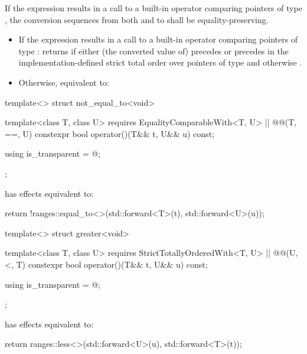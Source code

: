 {\begin{itemdescr}
\pnum
\oldtxt{\requires} \newtxt{\expects}
If the expression 
results in a call to a built-in operator \tcode{==} comparing pointers of type
, the conversion sequences from both  and  to 
shall be equality-preserving.

\pnum
\effects
\begin{itemize}
\item
If the expression  results in a
call to a built-in operator \tcode{==} comparing pointers of type :
returns  if either (the converted value of)  precedes
 or  precedes  in the implementation-defined strict
total order over pointers of type  and otherwise .

\item
Otherwise, equivalent to: 
\end{itemize}
\end{itemdescr}

%
\begin{itemdecl}
template<> struct not_equal_to<void> {
  template<class T, class U>
    requires EqualityComparableWith<T, U> || @\textit{}@(T, ==, U)
  constexpr bool operator()(T&& t, U&& u) const;

  using is_transparent = @\unspecnc@;
};
\end{itemdecl}

\begin{itemdescr}
\pnum
{} has effects equivalent to:
\begin{codeblock}
return !ranges::equal_to<>{}(std::forward<T>(t), std::forward<U>(u));
\end{codeblock}
\end{itemdescr}

%
\begin{itemdecl}
template<> struct greater<void> {
  template<class T, class U>
    requires StrictTotallyOrderedWith<T, U> || @\textit{}@(U, <, T)
  constexpr bool operator()(T&& t, U&& u) const;

  using is_transparent = @\unspecnc@;
};
\end{itemdecl}

\begin{itemdescr}
\pnum
{} has effects equivalent to:
\begin{codeblock}
return ranges::less<>{}(std::forward<U>(u), std::forward<T>(t));
\end{codeblock}
\end{itemdescr}

}
